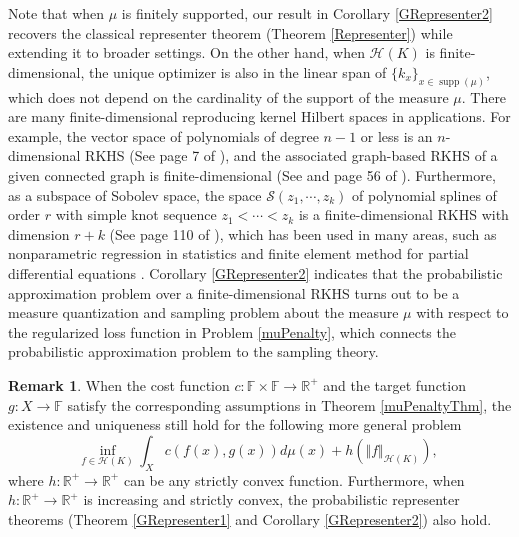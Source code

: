 \documentclass{amsart}
\numberwithin{equation}{section}
\DeclareMathOperator{\supp}{supp}
\theoremstyle{plain}
\theoremstyle{remark}
\theoremstyle{definition}
\newtheorem{remark}[subsection]{Remark}
\begin{document}
Note that when $\mu$ is finitely supported, our result in  Corollary \ref{GRepresenter2} recovers the classical representer theorem (Theorem \ref{Representer}) while extending it to broader settings.
On the other hand, when $\mathscr{H}(K)$ is finite-dimensional,  the unique optimizer is also in the linear span of $\{k_x\}_{x \in \supp(\mu)}$, which does not depend on the cardinality of the support of the measure $\mu$. There are many finite-dimensional reproducing kernel Hilbert spaces in applications. For example, the vector space of polynomials of degree $n-1$ or less is an $n$-dimensional RKHS (See page 7 of \cite{wahba1990spline}), and the associated graph-based RKHS of a given connected graph is finite-dimensional (See \cite{seto2014gram} and page 56 of \cite{saitoh2016theory}). Furthermore, as a subspace of Sobolev space, the space $\mathcal{S}(z_1, \cdots, z_k)$ of polynomial splines of order $r$ with simple knot sequence $z_1 < \cdots < z_k$  is a finite-dimensional RKHS with dimension $r+k$ (See page 110 of \cite{berlinet2011reproducing}), which has been used in many areas, such as nonparametric regression in statistics \cite{berlinet2011reproducing, wahba1990spline} and finite element method for partial differential equations \cite{hollig2003finite}. 
Corollary \ref{GRepresenter2} indicates that the probabilistic approximation problem over a finite-dimensional RKHS turns out to be a measure quantization and sampling problem about the measure $\mu$ with respect to the regularized loss function in Problem \ref{muPenalty}, which connects the probabilistic approximation problem to the sampling theory.%





\begin{remark}
     When the cost function $c: \mathbb{F} \times \mathbb{F} \rightarrow \mathbb{R}^+$ and the target function $g: X \rightarrow \mathbb{F}$ satisfy the corresponding assumptions in Theorem \ref{muPenaltyThm}, the existence and uniqueness still hold for the following more general problem
\begin{equation}
    \underset{f \in \mathscr{H}(K)}{\text{inf}} \ \int_{X} c(f(x),g(x))  d\mu(x)+ h( \Vert f \Vert_{\mathscr{H}(K)}),
\end{equation}
where $h:\mathbb{R}^{+} \rightarrow \mathbb{R}^{+}$ can be any strictly convex function.
Furthermore, when $h:\mathbb{R}^{+} \rightarrow \mathbb{R}^{+}$ is increasing and strictly convex, the probabilistic representer theorems (Theorem \ref{GRepresenter1} and Corollary \ref{GRepresenter2}) also hold. 
\end{remark}
\end{document}
